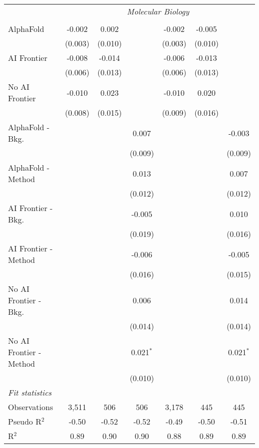 \begin{tabular}{lcccccc}
 & \multicolumn{6}{c}{\textit{Molecular Biology}} \\ \\
   AlphaFold               & -0.002  & 0.002   &             & -0.002  & -0.005  &   \\   
                           & (0.003) & (0.010) &             & (0.003) & (0.010) &   \\   
   AI Frontier             & -0.008  & -0.014  &             & -0.006  & -0.013  &   \\   
                           & (0.006) & (0.013) &             & (0.006) & (0.013) &   \\   
   No AI Frontier          & -0.010  & 0.023   &             & -0.010  & 0.020   &   \\   
                           & (0.008) & (0.015) &             & (0.009) & (0.016) &   \\   
   AlphaFold - Bkg.        &         &         & 0.007       &         &         & -0.003\\   
                           &         &         & (0.009)     &         &         & (0.009)\\   
   AlphaFold - Method      &         &         & 0.013       &         &         & 0.007\\   
                           &         &         & (0.012)     &         &         & (0.012)\\   
   AI Frontier - Bkg.      &         &         & -0.005      &         &         & 0.010\\   
                           &         &         & (0.019)     &         &         & (0.016)\\   
   AI Frontier - Method    &         &         & -0.006      &         &         & -0.005\\   
                           &         &         & (0.016)     &         &         & (0.015)\\   
   No AI Frontier - Bkg.   &         &         & 0.006       &         &         & 0.014\\   
                           &         &         & (0.014)     &         &         & (0.014)\\   
   No AI Frontier - Method &         &         & 0.021$^{*}$ &         &         & 0.021$^{*}$\\   
                           &         &         & (0.010)     &         &         & (0.010)\\   
   \midrule
   \emph{Fit statistics}\\
   Observations            & 3,511   & 506     & 506         & 3,178   & 445     & 445\\  
   Pseudo R$^2$            & -0.50   & -0.52   & -0.52       & -0.49   & -0.50   & -0.51\\  
   R$^2$                   & 0.89    & 0.90    & 0.90        & 0.88    & 0.89    & 0.89\\  
   

\end{tabular}
